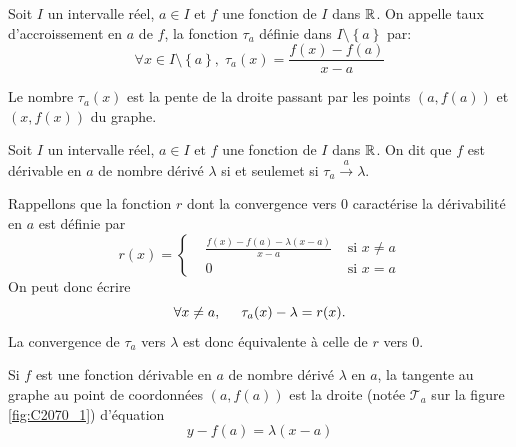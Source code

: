 \begin{defi}
  Soit $I$ un intervalle réel, $a\in I$ et $f$ une fonction de $I$ dans $\mathbb{R}$. On appelle taux d'accroissement en $a$ de $f$, la fonction $\tau_{a}$ définie dans $I\setminus\left\lbrace a\right\rbrace$ par:
\begin{displaymath}
  \forall x \in I\setminus\left\lbrace a\right\rbrace,\; \tau_a(x) = \frac{f(x) - f(a)}{x - a}
\end{displaymath}
\end{defi}
\begin{rem}
 Le nombre $\tau_a(x)$ est la pente de la droite passant par les points $(a,f(a))$ et $(x,f(x))$ du graphe.
\end{rem}

\begin{prop}
Soit $I$ un intervalle réel, $a\in I$ et $f$ une fonction de $I$ dans $\mathbb{R}$. On dit que $f$ est dérivable en $a$ de nombre dérivé $\lambda$ si et seulemet si
$\tau_a \xrightarrow{a} \lambda$.
\end{prop}
\begin{demo}
  Rappellons que la fonction $r$ dont la convergence vers $0$ caractérise la dérivabilité en $a$ est définie par 
\[
 r(x) = 
\left\lbrace 
\begin{aligned}
 &\frac{f(x) -f(a) -\lambda(x-a)}{x-a} &\text{ si } x\neq a\\ &0 &\text{ si } x = a
\end{aligned}
\right. 
\]
On peut donc écrire
\[
 \forall x\neq a,\hspace{0.5cm} \tau_a(x) - \lambda = r(x). 
\]
La convergence de $\tau_a$ vers $\lambda$ est donc équivalente à celle de $r$ vers $0$.
\end{demo}

\begin{defi}
  Si $f$ est une fonction dérivable en $a$ de nombre dérivé $\lambda$ en $a$, la tangente au graphe au point de coordonnées $(a,f(a))$ est la droite (notée $\mathcal{T}_a$ sur la figure \ref{fig:C2070_1}) d'équation
\begin{displaymath}
  y - f(a) = \lambda (x-a)
\end{displaymath}
\end{defi}


